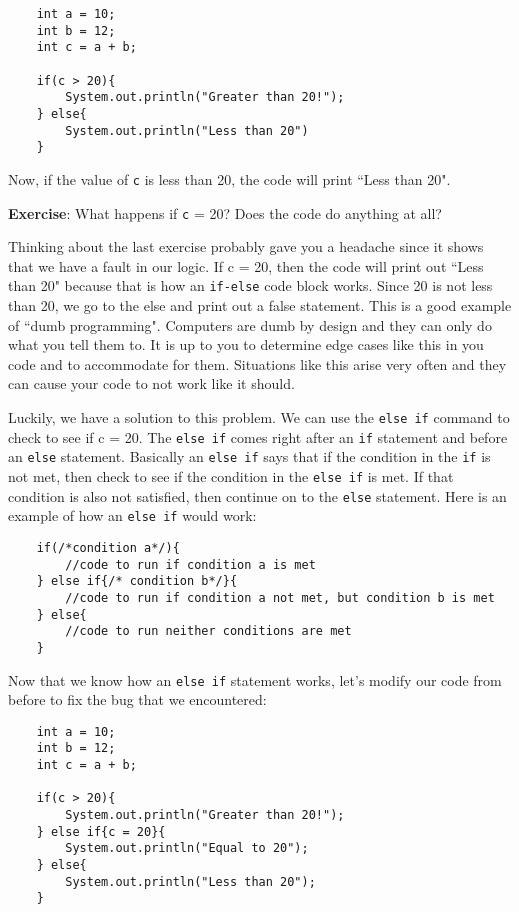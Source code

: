 \documentclass[11pt,fleqn]{article}
\begin{document}
\begin{verbatim}
    int a = 10;
    int b = 12;
    int c = a + b;

    if(c > 20){
        System.out.println("Greater than 20!");
    } else{
        System.out.println("Less than 20")
    }
\end{verbatim}

Now, if the value of \texttt{c} is less than 20, the code will print ``Less than
20". 

\textbf{Exercise}: What happens if \texttt{c} = 20? Does the code do anything at
all?

Thinking about the last exercise probably gave you a headache since it shows
that we have a fault in our logic. If c = 20, then the code will print out
``Less than 20" because that is how an \texttt{if-else} code block works. Since
20 is not less than 20, we go to the else and print out a false statement. This
is a good example of ``dumb programming". Computers are dumb by design and they
can only do what you tell them to. It is up to you to determine edge cases like
this in you code and to accommodate for them. Situations like this arise very
often and they can cause your code to not work like it should. 

Luckily, we have a solution to this problem. We can use the \texttt{else if}
command to check to see if c = 20. The \texttt{else if} comes right after an
\texttt{if} statement and before an \texttt{else} statement. Basically an
\texttt{else if} says that if the condition in the \texttt{if} is not met, then
check to see if the condition in the \texttt{else if} is met. If that condition
is also not satisfied, then continue on to the \texttt{else} statement. Here is
an example of how an \texttt{else if} would work:

\begin{verbatim}
    if(/*condition a*/){
        //code to run if condition a is met
    } else if{/* condition b*/}{
        //code to run if condition a not met, but condition b is met
    } else{
        //code to run neither conditions are met
    }
\end{verbatim}

Now that we know how an \texttt{else if} statement works, let's modify our code
from before to fix the bug that we encountered:

\begin{verbatim}
    int a = 10;
    int b = 12;
    int c = a + b;

    if(c > 20){
        System.out.println("Greater than 20!");
    } else if{c = 20}{
        System.out.println("Equal to 20");
    } else{
        System.out.println("Less than 20");
    }
\end{verbatim}
\end{document}
